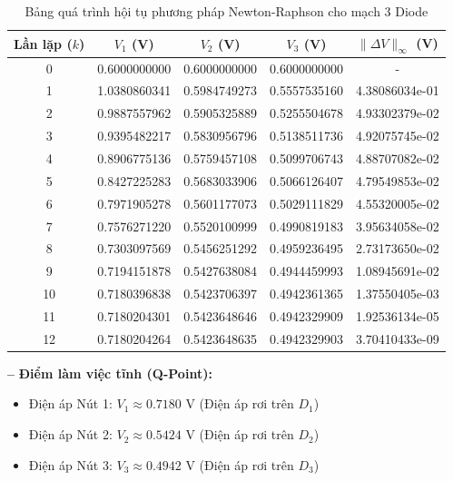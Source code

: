 \begin{table}[H]
    \centering
    \caption{Bảng quá trình hội tụ phương pháp Newton-Raphson cho mạch 3 Diode}
    \vspace{0.2cm}
    \begin{tabular}{|c|c|c|c|c|}
        \hline
        \textbf{Lần lặp ($k$)} & \textbf{$V_1$ (V)} & \textbf{$V_2$ (V)} & \textbf{$V_3$ (V)} & \textbf{$\|\Delta V\|_\infty$ (V)} \\ \hline
        0  & 0.6000000000 & 0.6000000000 & 0.6000000000 & - \\ \hline
        1  & 1.0380860341 & 0.5984749273 & 0.5557535160 & 4.38086034e-01 \\ \hline
        2  & 0.9887557962 & 0.5905325889 & 0.5255504678 & 4.93302379e-02 \\ \hline
        3  & 0.9395482217 & 0.5830956796 & 0.5138511736 & 4.92075745e-02 \\ \hline
        4  & 0.8906775136 & 0.5759457108 & 0.5099706743 & 4.88707082e-02 \\ \hline
        5  & 0.8427225283 & 0.5683033906 & 0.5066126407 & 4.79549853e-02 \\ \hline
        6  & 0.7971905278 & 0.5601177073 & 0.5029111829 & 4.55320005e-02 \\ \hline
        7  & 0.7576271220 & 0.5520100999 & 0.4990819183 & 3.95634058e-02 \\ \hline
        8  & 0.7303097569 & 0.5456251292 & 0.4959236495 & 2.73173650e-02 \\ \hline
        9  & 0.7194151878 & 0.5427638084 & 0.4944459993 & 1.08945691e-02 \\ \hline
        10 & 0.7180396838 & 0.5423706397 & 0.4942361365 & 1.37550405e-03 \\ \hline
        11 & 0.7180204301 & 0.5423648646 & 0.4942329909 & 1.92536134e-05 \\ \hline
        12 & 0.7180204264 & 0.5423648635 & 0.4942329903 & 3.70410433e-09 \\ \hline
    \end{tabular}
    \label{tab:diode_convergence}
\end{table}

\noindent \textbf{--} \textbf{Điểm làm việc tĩnh (Q-Point):}
\begin{itemize}[label=\textbf{+}]
    \item Điện áp Nút 1: $V_1 \approx 0.7180 \text{ V}$ (Điện áp rơi trên $D_1$)
    \item Điện áp Nút 2: $V_2 \approx 0.5424 \text{ V}$ (Điện áp rơi trên $D_2$)
    \item Điện áp Nút 3: $V_3 \approx 0.4942 \text{ V}$ (Điện áp rơi trên $D_3$)
\end{itemize}

